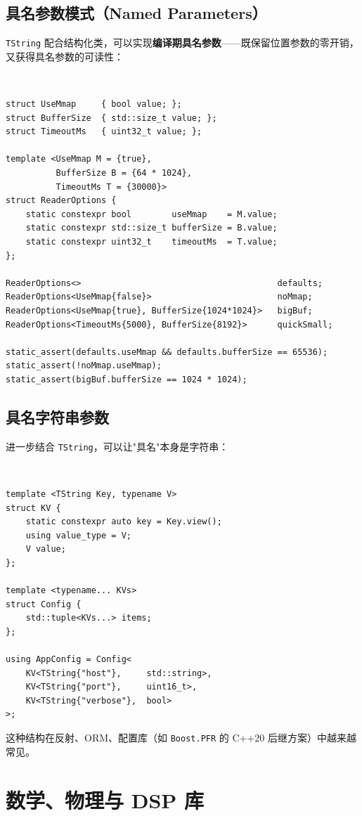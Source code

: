 \documentclass[12pt,a4paper,fontset=fandol]{ctexbook}
\newcommand{\cppxxlabel}[1]{%
  \tcbox[on line,colback=cpp20bg,colframe=cpp20bg,
    boxrule=0pt,arc=1pt,left=2pt,right=2pt,top=1pt,bottom=1pt,
    colupper=white,fontupper=\scriptsize\bfseries]{#1}}
\newcommand{\cpp}[1]{C++#1}
\newcommand{\kw}[1]{\texttt{#1}}
\begin{document}
\section{具名参数模式（Named Parameters）}

\kw{TString} 配合结构化类，可以实现\textbf{编译期具名参数}——既保留位置参数的零开销，又获得具名参数的可读性：

\cppxxlabel{C++20}\ \begin{lstlisting}
struct UseMmap     { bool value; };
struct BufferSize  { std::size_t value; };
struct TimeoutMs   { uint32_t value; };

template <UseMmap M = {true},
          BufferSize B = {64 * 1024},
          TimeoutMs T = {30000}>
struct ReaderOptions {
    static constexpr bool        useMmap    = M.value;
    static constexpr std::size_t bufferSize = B.value;
    static constexpr uint32_t    timeoutMs  = T.value;
};

ReaderOptions<>                                       defaults;
ReaderOptions<UseMmap{false}>                         noMmap;
ReaderOptions<UseMmap{true}, BufferSize{1024*1024}>   bigBuf;
ReaderOptions<TimeoutMs{5000}, BufferSize{8192}>      quickSmall;

static_assert(defaults.useMmap && defaults.bufferSize == 65536);
static_assert(!noMmap.useMmap);
static_assert(bigBuf.bufferSize == 1024 * 1024);
\end{lstlisting}

\section{具名字符串参数}

进一步结合 \kw{TString}，可以让"具名"本身是字符串：

\cppxxlabel{C++20}\ \begin{lstlisting}
template <TString Key, typename V>
struct KV {
    static constexpr auto key = Key.view();
    using value_type = V;
    V value;
};

template <typename... KVs>
struct Config {
    std::tuple<KVs...> items;
};

using AppConfig = Config<
    KV<TString{"host"},     std::string>,
    KV<TString{"port"},     uint16_t>,
    KV<TString{"verbose"},  bool>
>;
\end{lstlisting}

这种结构在反射、ORM、配置库（如 \kw{Boost.PFR} 的 \cpp{20} 后继方案）中越来越常见。

\chapter{数学、物理与 DSP 库}
\end{document}

